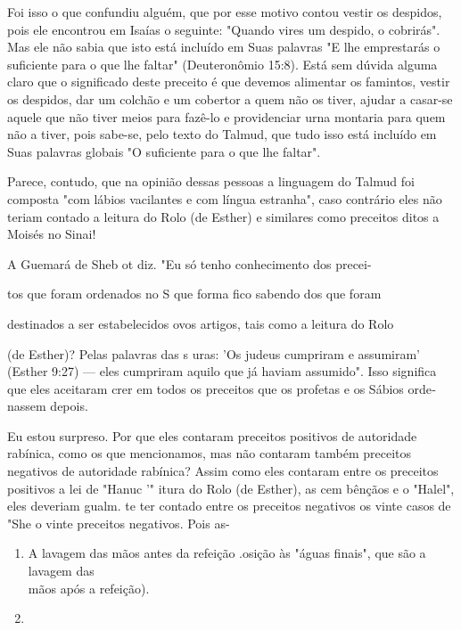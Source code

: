 \begin{itemize}
\begin{enumrate}
Foi isso o que confundiu alguém, que por esse motivo contou vestir os
despidos, pois ele encontrou em Isaías o seguinte: "Quando vires um
despi­do, o cobrirás". Mas ele não sabia que isto está incluído em Suas
palavras "E lhe emprestarás o suficiente para o que lhe faltar"
(Deuteronômio 15:8). Está sem dúvida alguma claro que o significado
deste preceito é que devemos ali­mentar os famintos, vestir os despidos,
dar um colchão e um cobertor a quem não os tiver, ajudar a casar-se
aquele que não tiver meios para fazê-lo e provi­denciar urna montaria
para quem não a tiver, pois sabe-se, pelo texto do Tal­mud, que tudo
isso está incluído em Suas palavras globais "O suficiente para o que lhe
faltar".

Parece, contudo, que na opinião dessas pessoas a linguagem do Tal­mud
foi composta "com lábios vacilantes e com língua estranha", caso
contrá­rio eles não teriam contado a leitura do Rolo (de Esther) e
similares como pre­ceitos ditos a Moisés no Sinai!


A Guemará de Sheb ot diz. "Eu só tenho conhecimento dos precei-


tos que foram ordenados no S que forma fico sabendo dos que foram

destinados a ser estabelecidos ovos artigos, tais como a leitura do Rolo

(de Esther)? Pelas palavras das s uras: 'Os judeus cumpriram e
assumiram' (Esther 9:27) --- eles cumpriram aquilo que já haviam
assumido". Isso significa que eles aceitaram crer em todos os preceitos
que os profetas e os Sábios orde­nassem depois.

Eu estou surpreso. Por que eles contaram preceitos positivos de
au­toridade rabínica, como os que mencionamos, mas não contaram também
pre­ceitos negativos de autoridade rabínica? Assim como eles contaram
entre os pre­ceitos positivos a lei de "Hanuc '" itura do Rolo (de
Esther), as cem bên­çãos e o "Halel", eles deveriam gualm. te ter
contado entre os preceitos ne­gativos os vinte casos de "She o vinte
preceitos negativos. Pois as-


\begin{enumerate}
\def\labelenumi{\arabic{enumi}.}
\setcounter{enumi}{2}
\item
 
 A lavagem das mãos antes da refeição .osição às "águas finais", que
 são a lavagem das\\
 mãos após a refeição).
 
\item
 

\end{enumerate}
\end{enumrate}
\end{itemize}
